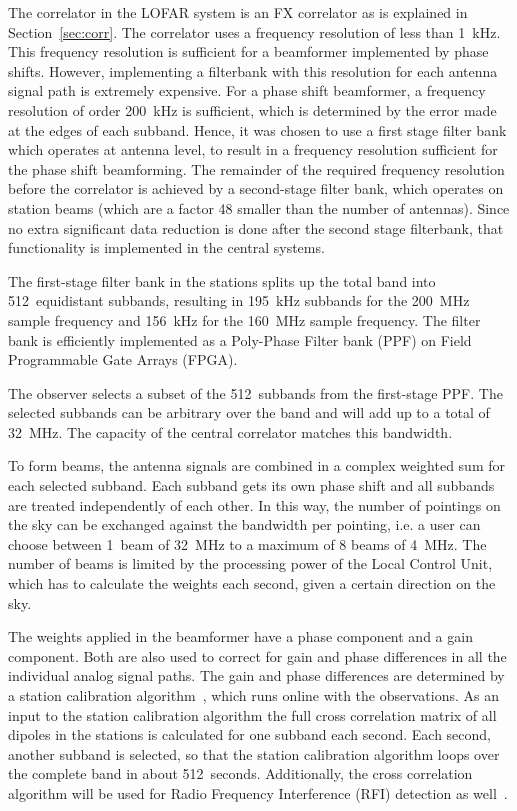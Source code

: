 \documentclass[journal]{IEEEtran}
\begin{document}
The correlator in the LOFAR system is an FX correlator as is explained in
Section~\ref{sec:corr}.
The correlator uses a frequency resolution of less than 1~kHz.
This frequency resolution is sufficient for a beamformer implemented by
phase shifts.
However, implementing a filterbank with this resolution for each antenna
signal path is extremely expensive.
For a phase shift beamformer, a frequency resolution of order 200~kHz is
sufficient, which is determined by the error made at the edges of each subband.
Hence, it was chosen to use a first stage filter bank which operates at antenna
level, to result in a frequency resolution sufficient for the phase shift
beamforming.
The remainder of the required frequency resolution before the correlator is
achieved by a second-stage filter bank, which operates on station beams
(which are a factor 48 smaller than the number of antennas).
Since no extra significant data reduction is done after the second stage
filterbank, that functionality is implemented in the central systems.

The first-stage filter bank in the stations splits up the total band into
512~equidistant subbands, resulting in 195~kHz subbands for the 200~MHz
sample frequency and 156~kHz for the 160~MHz sample frequency.
The filter bank is efficiently implemented as a Poly-Phase Filter bank (PPF)
on Field Programmable Gate Arrays (FPGA).

The observer selects a subset of the 512~subbands from the first-stage PPF.
The selected subbands can be arbitrary over the band and will add up to a
total of 32~MHz.
The capacity of the central correlator matches this bandwidth.

To form beams, the antenna signals are combined in a complex weighted sum
for each selected subband.
Each subband gets its own phase shift and all subbands are treated
independently of each other.
In this way, the number of pointings on the sky can be exchanged against
the bandwidth per pointing, i.e. a user can choose between 1~beam of 32~MHz
to a maximum of 8 beams of 4~MHz.
The number of beams is limited by the processing power of the Local Control
Unit, which has to calculate the weights each second, given a certain
direction on the sky. 

The weights applied in the beamformer have a phase component and a gain
component.
Both are also used to correct for gain and phase differences in all the
individual analog signal paths.
The gain and phase differences are determined by a station calibration
algorithm~\cite{stefan:06}, which runs online with the observations.
As an input to the station calibration algorithm the full cross correlation
matrix of all dipoles in the stations is calculated for one subband each
second.
Each second, another subband is selected, so that the station calibration
algorithm loops over the complete band in about 512~seconds.
Additionally, the cross correlation algorithm will be used for
Radio Frequency Interference (RFI) detection as well~\cite{Boonstra:05}.
\end{document}
